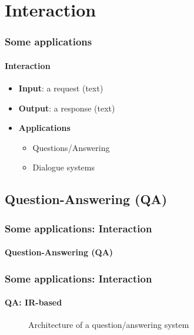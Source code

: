 \documentclass[xcolor=table]{beamer}
\begin{document}
\section{Interaction}

\begin{frame}
	\frametitle{Some applications}
	\framesubtitle{Interaction}
	\begin{itemize}
		\item \textbf{Input}: a request (text)
		\item \textbf{Output}: a response (text)
		\item \textbf{Applications} 
		\begin{itemize}
			\item Questions/Answering
			\item Dialogue systems
		\end{itemize}
	\end{itemize}
\end{frame}

\subsection{Question-Answering (QA)}

\begin{frame}
	\frametitle{Some applications: Interaction}
	\framesubtitle{Question-Answering (QA)}

\end{frame}

\begin{frame}
	\frametitle{Some applications: Interaction}
	\framesubtitle{QA: IR-based}
	
	\begin{figure}
		\caption{Architecture of a question/answering system \cite{2019-jurafsky-martin}}
	\end{figure}
	
\end{frame}
\end{document}
